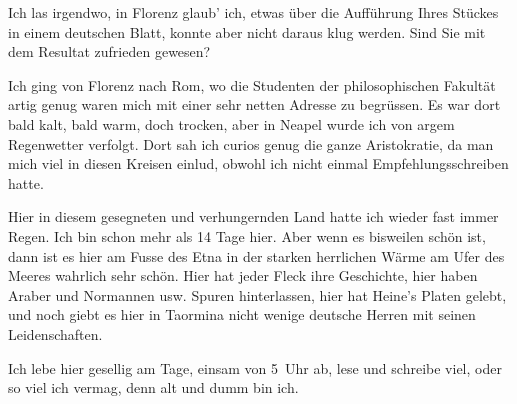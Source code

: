 \pstart
           Ich las irgendwo, in Florenz glaub’ ich, etwas
               über die Aufführung Ihres Stückes in einem deutschen Blatt, konnte aber nicht daraus klug werden. Sind
               Sie mit dem Resultat zufrieden gewesen?\pend
           
\pstart
           Ich ging von Florenz nach Rom, wo die Studenten der philosophischen Fakultät artig genug waren mich mit einer sehr netten
               Adresse zu begrüssen. Es war dort bald kalt, bald warm, doch trocken, aber in Neapel wurde ich von argem Regenwetter verfolgt.
               Dort sah ich curios genug die ganze Aristokratie, da man mich {\pb}viel in diesen Kreisen einlud,
               obwohl ich nicht einmal Empfehlungsschreiben hatte.\pend
           
\pstart
           Hier in diesem gesegneten und verhungernden Land hatte ich wieder fast immer Regen.
               Ich bin schon mehr als 14 Tage hier. Aber wenn es bisweilen schön ist, dann ist es
               hier am Fusse des Etna in der starken herrlichen
               Wärme am Ufer des Meeres wahrlich sehr schön. Hier hat jeder Fleck ihre Geschichte,
               hier haben Araber und Normannen usw. Spuren hinterlassen, hier hat Heine’s Platen gelebt, und noch giebt es hier in Taormina nicht wenige deutsche Herren mit seinen Leidenschaften.\pend
           
\pstart
           Ich lebe hier gesellig am Tage, einsam {\pb}von 5 Uhr ab, lese und schreibe
               viel, oder so viel ich vermag, denn alt und dumm bin ich.\pend
           
